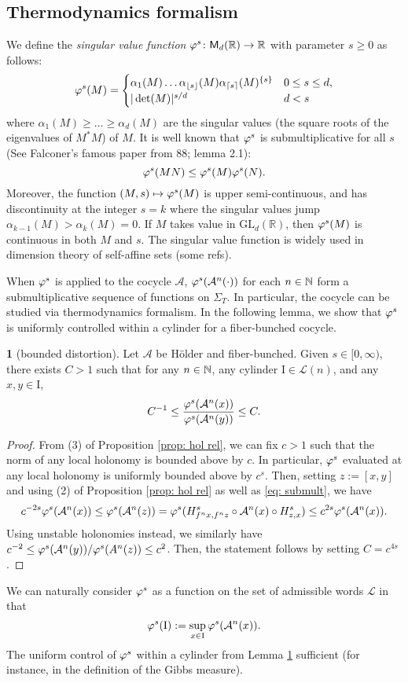 \documentclass[11pt,oneside,reqno]{amsart}
\numberwithin{equation}{section}
\numberwithin{figure}{section}
\theoremstyle{definition}
\theoremstyle{definition}
\theoremstyle{definition}
\theoremstyle{definition}
\newtheorem{lem}[thm]{\protect\lemmaname}
\theoremstyle{remark}
\theoremstyle{definition}
\theoremstyle{definition}
\theoremstyle{definition}
\def\A{\mathcal{A}}
\def\L{\mathcal{L}}
\def\R{\mathbb{R}}
\def\I{\mathrm{I}}
\def\Md{\mathsf{M}_d(\R)}
\def\vps{\vphi^s}
\def\hol{H\"older }
\def\fb{fiber-bunched }
\newcommand{\Sig}{\Sigma_T}
\newcommand{\glr}{\text{GL}_d(\R)}
\providecommand{\lemmaname}{Lemma}
\begin{document}
\subsection{Thermodynamics formalism}
We define the \textit{singular value function} $\vps \colon \Md \to \R$ with parameter $s\geq 0 $ as follows:
$$\vps(M) = \begin{cases} 
      \alpha_1(M)\ldots\alpha_{\lfloor s \rfloor}(M)\alpha_{\lceil s \rceil}(M)^{\{s\}} & 0\leq s \leq d ,\\
      |\det(M)|^{s/d} & d < s
   \end{cases}$$
where $\alpha_1(M) \geq \ldots \geq \alpha_d(M)$ are the singular values (the square roots of the eigenvalues of $M^*M$) of $M$. 
It is well known that $\vps$ is submultiplicative for all $s$ (See Falconer's famous paper from 88; lemma 2.1):
\begin{equation}\label{eq: submult}
\vps(MN) \leq \vps(M) \vps(N).
\end{equation}
Moreover, the function $(M,s) \mapsto \vps(M)$ is upper semi-continuous, and has discontinuity at the integer $s=k$ where the singular values jump $\alpha_{k-1}(M)>\alpha_k(M) = 0$. If $M$ takes value in $\glr$, then $\vps(M)$ is continuous in both $M$ and $s$.
The singular value function is widely used in dimension theory of self-affine sets (some refs).

When $\vps$ is applied to the cocycle $\A$, $\vps(\A^n(\cdot))$ for each $n \in \mathbb{N}$ form a submultiplicative sequence of functions on $\Sig$. In particular, the cocycle can be studied via thermodynamics formalism. 
In the following lemma, we show that $\vps$ is uniformly controlled within a cylinder for a \fb cocycle.
\begin{lem}[bounded distortion]\label{lem: bdd distortion} Let $\A$ be \hol and fiber-bunched.
Given $s \in [0,\infty)$, there exists $C>1$ such that for any $n \in \mathbb{N}$, any cylinder $\I \in \L(n)$, and any $x,y \in \I$, 
$$C^{-1} \leq \frac{\vps(\A^n(x))}{\vps(\A^n(y))} \leq C.$$ 
\end{lem}
\begin{proof}
From (3) of Proposition \ref{prop: hol rel}, we can fix $c>1$ such that the norm of any local holonomy is bounded above by $c$. In particular, $\vps$ evaluated at any local holonomy is uniformly bounded above by $c^s$. 
Then, setting $z:=[x,y]$ and using (2) of Proposition \ref{prop:  hol rel} as well as \eqref{eq: submult}, we have 
$$c^{-2s}\vps(\A^n(x)) \leq  \vps(\A^n(z)) =\vps( H^s_{f^nx,f^nz} \circ \A^n(x) \circ H^s_{z,x}) \leq c^{2s} \vps(\A^n(x)).$$
Using unstable holonomies instead, we similarly have $c^{-2} \leq \vps(\A^n(y))/\vps(A^n(z))\leq c^2$.
Then, the statement follows by setting $C = c^{4s}$.
\end{proof}
We can naturally consider $\vps$ as a function on the set of admissible words $\L$ in that
$$\vps(\I) := \sup\limits_{x \in \I} \vps(\A^n(x)).$$
The uniform control of $\vps$ within a cylinder from Lemma \ref{lem: bdd distortion} sufficient (for instance, in the definition of the Gibbs measure). 
\end{document}
